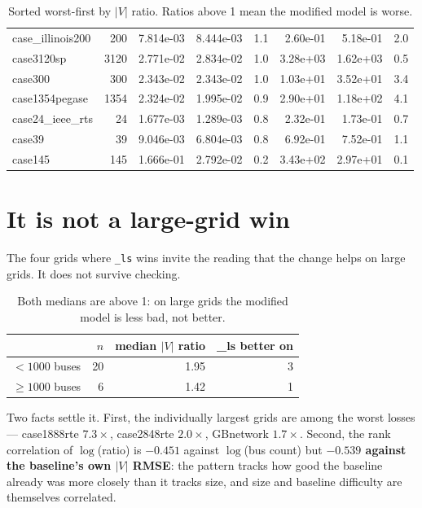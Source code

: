 \documentclass[10pt]{article}
\begin{document}
\begin{table}[H]
\begin{tabular}{lrrrrrrr}
case\_illinois200 & 200 & 7.814e-03 & 8.444e-03 & 1.1 & 2.60e-01 & 5.18e-01 & 2.0 \\
case3120sp & 3120 & 2.771e-02 & 2.834e-02 & 1.0 & 3.28e+03 & 1.62e+03 & 0.5 \\
case300 & 300 & 2.343e-02 & 2.343e-02 & 1.0 & 1.03e+01 & 3.52e+01 & 3.4 \\
case1354pegase & 1354 & 2.324e-02 & 1.995e-02 & 0.9 & 2.90e+01 & 1.18e+02 & 4.1 \\
case24\_ieee\_rts & 24 & 1.677e-03 & 1.289e-03 & 0.8 & 2.32e-01 & 1.73e-01 & 0.7 \\
case39 & 39 & 9.046e-03 & 6.804e-03 & 0.8 & 6.92e-01 & 7.52e-01 & 1.1 \\
case145 & 145 & 1.666e-01 & 2.792e-02 & 0.2 & 3.43e+02 & 2.97e+01 & 0.1 \\
\bottomrule
\end{tabular}
\caption{Sorted worst-first by $|V|$ ratio. Ratios above 1 mean the modified
model is worse.}
\end{table}

\section{It is not a large-grid win}

The four grids where \texttt{\_ls} wins invite the reading that the change helps
on large grids. It does not survive checking.

\begin{table}[H]
\centering\small
\begin{tabular}{lrrr}
\toprule
 & $n$ & median $|V|$ ratio & \_ls better on \\
\midrule
$<1000$ buses    & 20 & 1.95 & 3 \\
$\geq 1000$ buses & 6 & 1.42 & 1 \\
\bottomrule
\end{tabular}
\caption{Both medians are above 1: on large grids the modified model is less bad,
not better.}
\end{table}

Two facts settle it. First, the individually largest grids are among the worst
losses --- case1888rte $7.3\times$, case2848rte $2.0\times$, GBnetwork
$1.7\times$. Second, the rank correlation of $\log$(ratio) is
$-0.451$ against $\log$(bus count) but \textbf{$-0.539$ against the baseline's
own $|V|$ RMSE}: the pattern tracks how good the baseline already was more
closely than it tracks size, and size and baseline difficulty are themselves
correlated.
\end{document}
